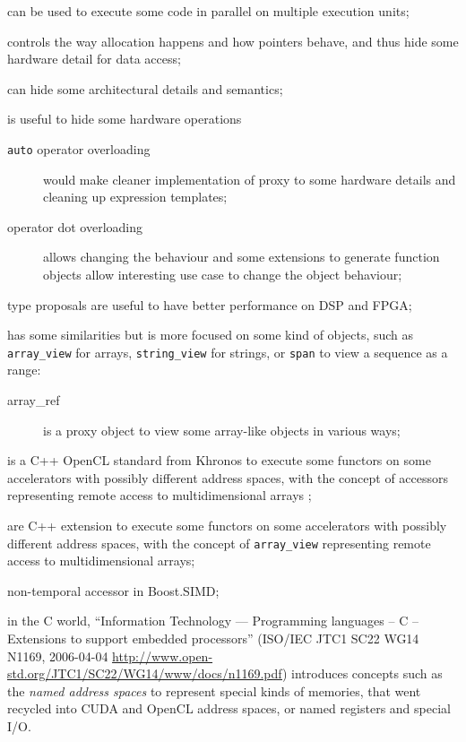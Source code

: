 \documentclass[a4paper]{article}
\begin{document}
\begin{description}
\item[\texttt{thread}] can be used to execute some code in parallel
  on multiple execution units;
\item[\texttt{allocator}] controls the way allocation happens and how
  pointers behave, and thus hide some hardware detail for data access;
\item[constructors and destructors] can hide some architectural details
  and semantics;
\item[operator overloading] is useful to hide some hardware
  operations
  \begin{description}
  \item[\texttt{auto} operator overloading] would make cleaner
    implementation of proxy to some hardware details and cleaning up
    expression templates;
  \item[operator dot overloading] \cite{C++:P00252R0:dot_operator}
    allows changing the behaviour and some extensions to generate
    function objects \cite{C++:P0060R0:function_operator_dot} allow
    interesting use case to change the object behaviour;
  \end{description}
\item[fixed-point] type proposals are useful to have better
  performance on DSP and FPGA;
\item[the concept of view] has some similarities but is more focused
  on some kind of objects, such as \lstinline|array_view| for arrays,
  \lstinline|string_view| for strings, or \lstinline|span| to view a
  sequence as a range:
  \begin{description}
  \item[array\_ref] \cite{C++:P0009R1:array_ref} is a proxy object to
    view some array-like objects in various ways;
  \end{description}
\item[SYCL] is a C++ OpenCL standard from Khronos to execute some
  functors on some accelerators with possibly different address
  spaces, with the concept of accessors representing remote access to
  multidimensional arrays \cite{C++:P00236R0:SYCL};
\item[C++AMP and hcc] \cite{C++:P0069R0:hcc} are C++ extension to
  execute some functors on some accelerators with possibly different
  address spaces, with the concept of \lstinline|array_view|
  representing remote access to multidimensional arrays;

\item non-temporal accessor in Boost.SIMD;

\item[ISO/IEC TR 18037] in the C world, ``Information Technology ---
  Programming languages -- C -- Extensions to support embedded
  processors'' (ISO/IEC JTC1 SC22 WG14 N1169, 2006-04-04
  \url{http://www.open-std.org/JTC1/SC22/WG14/www/docs/n1169.pdf})
  introduces concepts such as the \emph{named address spaces} to
  represent special kinds of memories, that went recycled into CUDA
  and OpenCL address spaces, or named registers and special I/O.
\end{description}
\end{document}
